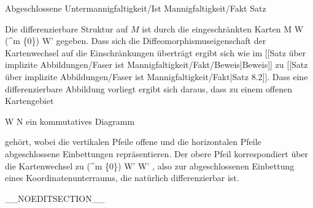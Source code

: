 {Abgeschlossene Untermannigfaltigkeit/Ist Mannigfaltigkeit/Fakt}
{Satz}
{}
{

\faktzusatz {}
\faktzusatz {}

}
{

Die differenzierbare Struktur auf $M$ ist durch die eingeschränkten Karten
 {M \cap W} {(\R^m \times \{0\}) \cap W'
} {}
gegeben. Dass sich die Diffeomorphismuseigenschaft der Kartenwechsel auf die Einschränkungen überträgt ergibt sich wie im [[Satz über implizite Abbildungen/Faser ist Mannigfaltigkeit/Fakt/Beweis|Beweis]] zu
[[Satz über implizite Abbildungen/Faser ist Mannigfaltigkeit/Fakt|Satz 8.2]].
Dass eine differenzierbare Abbildung vorliegt ergibt sich daraus, dass zu einem offenen Kartengebiet

\mavergleichskette
{\vergleichskette
{ W
}
{ \subseteq }{ N
}
{  }{
}
{    }{
}
{   }{
}
}
{}{}{}
ein kommutatives Diagramm

 {  }

gehört, wobei die vertikalen Pfeile offene und die horizontalen Pfeile abgeschlossene Einbettungen repräsentieren. Der obere Pfeil korrespondiert über die Kartenwechsel zu
\maabbdisp {} {(\R^m \times \{0\}) \cap W'} {W'
} {,}
also zur abgeschlossenen Einbettung eines Koordinatenunterraums, die natür\-lich differenzierbar ist.

}

__NOEDITSECTION__

